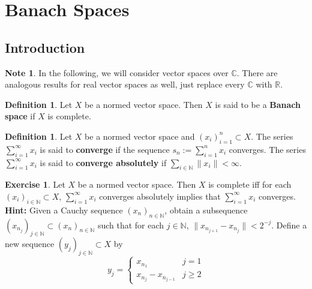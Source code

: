 \documentclass[12pt]{amsart}
\theoremstyle{definition}
\newtheorem{defn}[definition]{Definition}
\newtheorem{note}[definition]{Note}
\newtheorem{ex}[definition]{Exercise}
\newcommand{\C}{\mathbb{C}}
\newcommand{\N}{\mathbb{N}}
\newcommand{\R}{\mathbb{R}}
\newcommand{\seq}[2]{(#1_{#2})_{#2 \in \N}}
\newcommand{\lex}[1]{\label{ex:#1}}
\newcommand{\ld}[1]{\label{defn:#1}}
\begin{document}
	\section{Banach Spaces}
	\subsection{Introduction}
	\begin{note}
		In the following, we will consider vector spaces over $\C$. There are analogous results for real vector spaces as well, just replace every $\C$ with $\R$.
	\end{note}
	
	\begin{defn} \ld{}
		Let $X$ be a normed vector space. Then $X$ is said to be a \textbf{Banach space} if $X$ is complete.  
	\end{defn}
	
	\begin{defn} \ld{}
		Let $X$ be a normed vector space and $(x_i)_{i=1}^n \subset X$. The series $\sum_{i =1}^{\infty}x_i$ is said to \textbf{converge} if the sequence $s_n := \sum_{i=1}^n x_i$ converges. The series $\sum_{i =1}^{\infty}x_i$ is said to \textbf{converge absolutely} if $\sum_{i\in \N}\|x_i \|< \infty$.
	\end{defn}
	
	\begin{ex} \lex{}
		Let $X$ be a normed vector space. Then $X$ is complete iff for each $\seq{x}{i} \subset X$, $\sum_{i =1}^{\infty}x_i$ converges absolutely implies that $\sum_{i=1}^{\infty}x_i$ converges. \\
		\textbf{Hint:} Given a Cauchy sequence $(x_n)_{n \in \N}$, obtain a subsequence $(x_{n_j})_{j \in \N} \subset (x_n)_{n \in \N}$ such that for each $j \in \N$, $\|x_{n_{j+1}} - x_{n_{j}}\| < 2^{-j}$. Define a new sequence $(y_j)_{j \in \N} \subset X$ by 
		\[
		y_j = 
		\begin{cases}
		x_{n_1} & j =1 \\  
		x_{n_j} - x_{n_{j-1}} & j \geq 2	
		\end{cases}
		\] 
	\end{ex}
	
\end{document}

